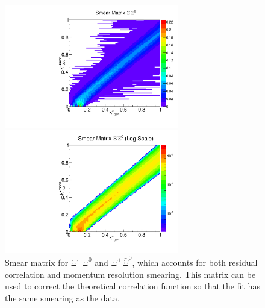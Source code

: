 \begin{figure}[h]
\begin{minipage}{18pc}
\includegraphics[width=18pc]{Figures/SmearMatrices/2016-7-19-SmearMatrixXiCXi0NormLLAA.pdf}
\end{minipage}\hspace{2pc}
\begin{minipage}{18pc}
\includegraphics[width=18pc]{Figures/SmearMatrices/2016-7-19-SmearMatrixXiCXi0NormLLAALog.pdf}
\end{minipage} 
\caption[Smear matrix -- $\Xi^{-}\Xi^0$ and $\Xi^{+}\bar{\Xi}^0$]{
Smear matrix for $\Xi^{-}\Xi^0$ and $\Xi^{+}\bar{\Xi}^0$, which accounts for both residual correlation and momentum resolution smearing. This matrix can be used to correct the theoretical correlation function so that the fit has the same smearing as the data.
}
\end{figure}

